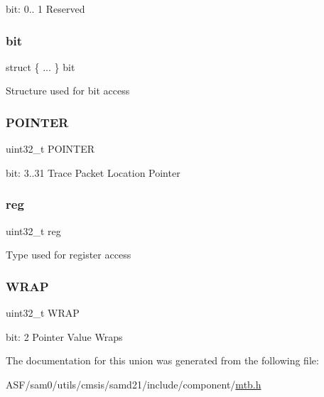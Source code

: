 bit\+: 0.. 1 Reserved \mbox{\label{union_m_t_b___p_o_s_i_t_i_o_n___type_a3f792c8aa94dbfaf274cfefc78354ead}} 
\subsubsection{\texorpdfstring{bit}{bit}}
{\footnotesize\ttfamily struct \{ ... \}   bit}

Structure used for bit access \mbox{\label{union_m_t_b___p_o_s_i_t_i_o_n___type_a65a01145059b5889aba2e53ac953c082}} 
\subsubsection{\texorpdfstring{POINTER}{POINTER}}
{\footnotesize\ttfamily uint32\+\_\+t P\+O\+I\+N\+T\+ER}

bit\+: 3..31 Trace Packet Location Pointer \mbox{\label{union_m_t_b___p_o_s_i_t_i_o_n___type_a6b91636401516a477989a336376d7b40}} 
\subsubsection{\texorpdfstring{reg}{reg}}
{\footnotesize\ttfamily uint32\+\_\+t reg}

Type used for register access \mbox{\label{union_m_t_b___p_o_s_i_t_i_o_n___type_a418c724bbd7d956209b2a4bc6e019b93}} 
\subsubsection{\texorpdfstring{WRAP}{WRAP}}
{\footnotesize\ttfamily uint32\+\_\+t W\+R\+AP}

bit\+: 2 Pointer Value Wraps 

The documentation for this union was generated from the following file\+:\begin{DoxyCompactItemize}
\item 
A\+S\+F/sam0/utils/cmsis/samd21/include/component/\mbox{\hyperlink{component_2mtb_8h}{mtb.\+h}}\end{DoxyCompactItemize}
